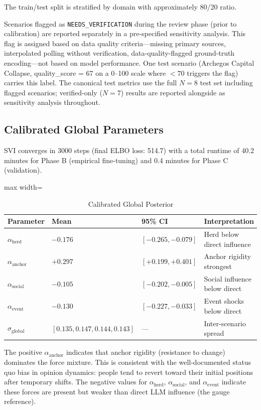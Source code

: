 \documentclass[12pt]{article}
\begin{document}
The train/test split is stratified by domain with approximately 80/20 ratio.

Scenarios flagged as \texttt{NEEDS\_VERIFICATION} during the review phase (prior to calibration) are reported separately in a pre-specified sensitivity analysis. This flag is assigned based on data quality criteria---missing primary sources, interpolated polling without verification, data-quality-flagged ground-truth encoding---not based on model performance. One test scenario (Archegos Capital Collapse, quality\_score = 67 on a 0--100 scale where $<70$ triggers the flag) carries this label. The canonical test metrics use the full $N=8$ test set including flagged scenarios; verified-only ($N=7$) results are reported alongside as sensitivity analysis throughout.

\subsection{Calibrated Global Parameters}

SVI converges in 3000 steps (final ELBO loss: 514.7) with a total runtime of 40.2 minutes for Phase B (empirical fine-tuning) and 0.4 minutes for Phase C (validation).

\begin{table}[H]
\centering
\caption{Calibrated Global Posterior}
\label{tab:global_posterior}
\begin{adjustbox}{max width=\textwidth}
\begin{tabular}{@{}llll@{}}
\toprule
Parameter & Mean & 95\% CI & Interpretation \\
\midrule
$\alpha_{\text{herd}}$ & $-0.176$ & $[-0.265, -0.079]$ & Herd below direct influence \\
$\alpha_{\text{anchor}}$ & $+0.297$ & $[+0.199, +0.401]$ & Anchor rigidity strongest \\
$\alpha_{\text{social}}$ & $-0.105$ & $[-0.202, -0.005]$ & Social influence below direct \\
$\alpha_{\text{event}}$ & $-0.130$ & $[-0.227, -0.033]$ & Event shocks below direct \\
$\sigma_{\text{global}}$ & $[0.135, 0.147, 0.144, 0.143]$ & --- & Inter-scenario spread \\
\bottomrule
\end{tabular}
\end{adjustbox}
\end{table}

The positive $\alpha_{\text{anchor}}$ indicates that anchor rigidity (resistance to change) dominates the force mixture. This is consistent with the well-documented status quo bias in opinion dynamics: people tend to revert toward their initial positions after temporary shifts. The negative values for $\alpha_{\text{herd}}$, $\alpha_{\text{social}}$, and $\alpha_{\text{event}}$ indicate these forces are present but weaker than direct LLM influence (the gauge reference).
\end{document}
